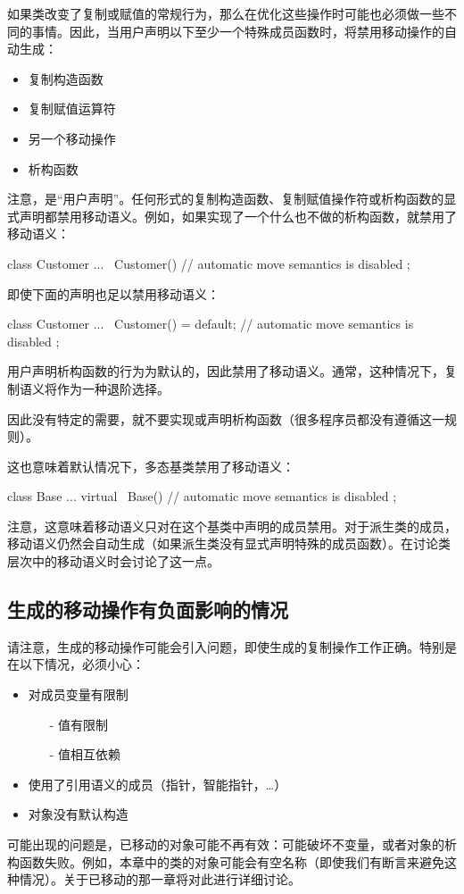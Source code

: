 如果类改变了复制或赋值的常规行为，那么在优化这些操作时可能也必须做一些不同的事情。因此，当用户声明以下至少一个特殊成员函数时，将禁用移动操作的自动生成：

\begin{itemize}
	\item 复制构造函数
	\item 复制赋值运算符
	\item 另一个移动操作
	\item 析构函数
\end{itemize}

注意，是“用户声明”。任何形式的复制构造函数、复制赋值操作符或析构函数的显式声明都禁用移动语义。例如，如果实现了一个什么也不做的析构函数，就禁用了移动语义：

\begin{cppcode}
class Customer {
	...
	~Customer() { // automatic move semantics is disabled
	}
};
\end{cppcode}

即使下面的声明也足以禁用移动语义：

\begin{cppcode}
class Customer {
	...
	~Customer() = default; // automatic move semantics is disabled
};
\end{cppcode}

用户声明析构函数的行为为默认的，因此禁用了移动语义。通常，这种情况下，复制语义将作为一种退阶选择。

因此没有特定的需要，就不要实现或声明析构函数（很多程序员都没有遵循这一规则）。

这也意味着默认情况下，多态基类禁用了移动语义：

\begin{cppcode}
class Base {
	...
	virtual ~Base() { // automatic move semantics is disabled
	}
};
\end{cppcode}

注意，这意味着移动语义只对在这个基类中声明的成员禁用。对于派生类的成员，移动语义仍然会自动生成（如果派生类没有显式声明特殊的成员函数）。在讨论类层次中的移动语义时会讨论了这一点。

\subsection{生成的移动操作有负面影响的情况}

请注意，生成的移动操作可能会引入问题，即使生成的复制操作工作正确。特别是在以下情况，必须小心：

\begin{itemize}
	\item 对成员变量有限制
	\begin{itemize}
		\item[-] 值有限制
		\item[-] 值相互依赖
	\end{itemize}
	\item 使用了引用语义的成员（指针，智能指针，…）
	\item 对象没有默认构造
\end{itemize}

可能出现的问题是，已移动的对象可能不再有效：可能破坏不变量，或者对象的析构函数失败。例如，本章中的类的对象可能会有空名称（即使我们有断言来避免这种情况）。关于已移动的那一章将对此进行详细讨论。











